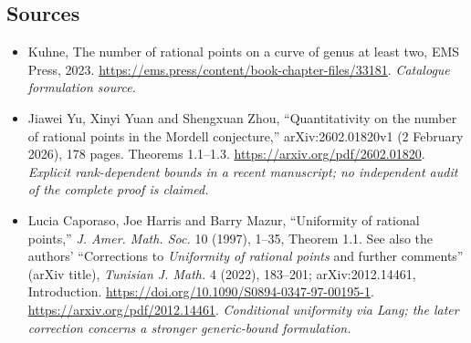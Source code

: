 \documentclass[11pt,a4paper]{article}
\numberwithin{equation}{section}
\begin{document}
\subsection{Sources}
\begin{itemize}\raggedright
\item[\textnormal{[S1]}]\hypertarget{source:30006763:1}{} Kuhne, The number of rational points on a curve of genus at least two, EMS Press, 2023.
\url{https://ems.press/content/book-chapter-files/33181}.
{\small\textit{Catalogue formulation source.}}
\item[\textnormal{[E1]}]\hypertarget{extra:30006763:1}{} Jiawei Yu, Xinyi Yuan and Shengxuan Zhou, ``Quantitativity on the number of rational points in the Mordell conjecture,'' arXiv:2602.01820v1 (2 February 2026), 178 pages. Theorems 1.1--1.3.
\url{https://arxiv.org/pdf/2602.01820}.
{\small\textit{Explicit rank-dependent bounds in a recent manuscript; no independent audit of the complete proof is claimed.}}
\item[\textnormal{[E2]}]\hypertarget{extra:30006763:2}{} Lucia Caporaso, Joe Harris and Barry Mazur, ``Uniformity of rational points,'' \emph{J. Amer. Math. Soc.} 10 (1997), 1--35, Theorem 1.1. See also the authors' ``Corrections to \emph{Uniformity of rational points} and further comments'' (arXiv title), \emph{Tunisian J. Math.} 4 (2022), 183--201; arXiv:2012.14461, Introduction.
\url{https://doi.org/10.1090/S0894-0347-97-00195-1}.
\url{https://arxiv.org/pdf/2012.14461}.
{\small\textit{Conditional uniformity via Lang; the later correction concerns a stronger generic-bound formulation.}}
\end{itemize}
\end{document}
